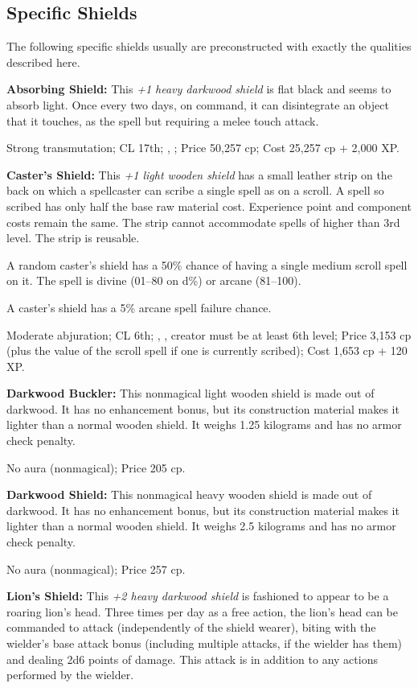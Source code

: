 \subsection{Specific Shields}
The following specific shields usually are preconstructed with exactly the qualities described here.

\textbf{Absorbing Shield:} This \emph{+1 heavy darkwood shield} is flat black and seems to absorb light. Once every two days, on command, it can disintegrate an object that it touches, as the spell but requiring a melee touch attack.

Strong transmutation; CL 17th; , ; Price 50,257 cp; Cost 25,257 cp + 2,000 XP.

\textbf{Caster's Shield:} This \emph{+1 light wooden shield} has a small leather strip on the back on which a spellcaster can scribe a single spell as on a scroll. A spell so scribed has only half the base raw material cost. Experience point and component costs remain the same. The strip cannot accommodate spells of higher than 3rd level. The strip is reusable.

A random caster's shield has a 50\% chance of having a single medium scroll spell on it. The spell is divine (01--80 on d\%) or arcane (81--100).

A caster's shield has a 5\% arcane spell failure chance.

Moderate abjuration; CL 6th; , , creator must be at least 6th level; Price 3,153 cp (plus the value of the scroll spell if one is currently scribed); Cost 1,653 cp + 120 XP.

\textbf{Darkwood Buckler:} This nonmagical light wooden shield is made out of darkwood. It has no enhancement bonus, but its construction material makes it lighter than a normal wooden shield. It weighs 1.25 kilograms and has no armor check penalty.

No aura (nonmagical); Price 205 cp.

\textbf{Darkwood Shield:} This nonmagical heavy wooden shield is made out of darkwood. It has no enhancement bonus, but its construction material makes it lighter than a normal wooden shield. It weighs 2.5 kilograms and has no armor check penalty.

No aura (nonmagical); Price 257 cp.

\textbf{Lion's Shield:} This \emph{+2 heavy darkwood shield} is fashioned to appear to be a roaring lion's head. Three times per day as a free action, the lion's head can be commanded to attack (independently of the shield wearer), biting with the wielder's base attack bonus (including multiple attacks, if the wielder has them) and dealing 2d6 points of damage. This attack is in addition to any actions performed by the wielder.

